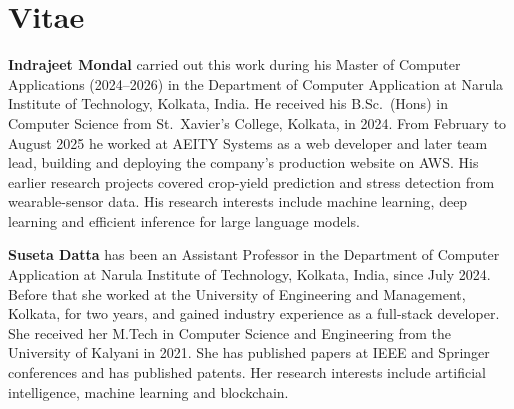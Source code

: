 \documentclass[11pt]{article}
\begin{document}
\section*{Vitae}

\noindent\textbf{Indrajeet Mondal} carried out this work during his Master of
Computer Applications (2024--2026) in the Department of Computer Application
at Narula Institute of Technology, Kolkata, India. He received his B.Sc.\
(Hons) in Computer Science from St.\ Xavier's College, Kolkata, in 2024. From
February to August 2025 he worked at AEITY Systems as a web developer and
later team lead, building and deploying the company's production website on
AWS. His earlier research projects covered crop-yield prediction and stress
detection from wearable-sensor data. His research interests include machine
learning, deep learning and efficient inference for large language models.

\bigskip

\noindent\textbf{Suseta Datta} has been an Assistant Professor in the
Department of Computer Application at Narula Institute of Technology,
Kolkata, India, since July 2024. Before that she worked at the University of
Engineering and Management, Kolkata, for two years, and gained industry
experience as a full-stack developer. She received her M.Tech in Computer
Science and Engineering from the University of Kalyani in 2021. She has
published papers at IEEE and Springer conferences and has published patents.
Her research interests include artificial intelligence, machine learning and
blockchain.
\end{document}
